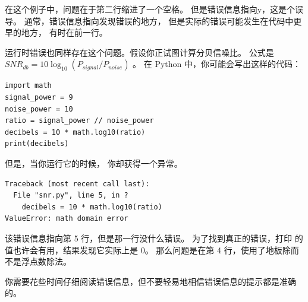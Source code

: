 {{{{在这个例子中，问题在于第二行缩进了一个空格。
但是错误信息指向y，这是个误导。 通常，错误信息指向发现错误的地方，
但是实际的错误可能发生在代码中更早的地方， 有时在前一行。
  


运行时错误也同样存在这个问题。假设你正试图计算分贝信噪比。
公式是 $SNR_{db} = 10 \log_{10} (P_{signal} / P_{noise})$ 。
在 Python 中，你可能会写出这样的代码：

\begin{lstlisting}
import math
signal_power = 9
noise_power = 10
ratio = signal_power // noise_power
decibels = 10 * math.log10(ratio)
print(decibels)
\end{lstlisting}

%

但是，当你运行它的时候， 你却获得一个异常。

%
  

\begin{lstlisting}
Traceback (most recent call last):
  File "snr.py", line 5, in ?
    decibels = 10 * math.log10(ratio)
ValueError: math domain error
\end{lstlisting}

%

该错误信息指向第 5 行，但是那一行没什么错误。
为了找到真正的错误，打印  的值也许会有用，结果发现它实际上是 0。
那么问题是在第 4 行，使用了地板除而不是浮点数除法。
  


你需要花些时间仔细阅读错误信息，但不要轻易地相信错误信息的提示都是准确的。

}}}}
